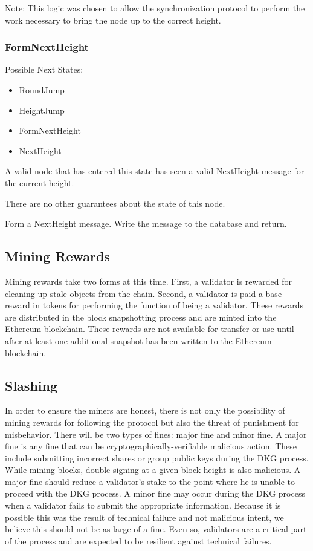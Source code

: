 Note: This logic was chosen to allow the synchronization protocol to
perform the work necessary to bring the node up to the correct height.


\subsubsection{FormNextHeight}

Possible Next States:

\begin{itemize}
    \item RoundJump
    \item HeightJump
    \item FormNextHeight
    \item NextHeight
\end{itemize}

A valid node that has entered this state has seen a valid NextHeight
message for the current height.

There are no other guarantees about the state of this node.

Form a NextHeight message.
Write the message to the database and return.


\subsection{Mining Rewards}

Mining rewards take two forms at this time.
First, a validator is rewarded for cleaning up stale \DataStore{} objects
from the chain.
Second, a validator is paid a base reward in tokens for performing the
function of being a validator.
These rewards are distributed in the block snapshotting process and are
minted into the Ethereum blockchain.
These rewards are not available for transfer or use until after at
least one additional snapshot has been written to the Ethereum
blockchain.


\subsection{Slashing}

In order to ensure the miners are honest, there is not only the
possibility of mining rewards for following the protocol but also
the threat of punishment for misbehavior.
There will be two types of fines: major fine and minor fine.
A major fine is any fine that can be cryptographically-verifiable
malicious action.
These include submitting incorrect shares or group public keys during
the DKG process.
While mining blocks, double-signing at a given block height is
also malicious.
A major fine should reduce a validator's stake to the point where he
is unable to proceed with the DKG process.
A minor fine may occur during the DKG process when a validator fails
to submit the appropriate information.
Because it is possible this was the result of technical failure and
not malicious intent, we believe this should not be as large of a fine.
Even so, validators are a critical part of the process and are expected
to be resilient against technical failures.


